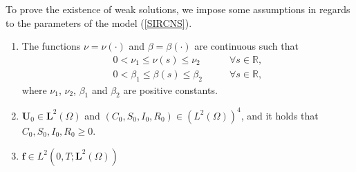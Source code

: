 \documentclass[10pt,number,preprint,times]{elsarticle}
\numberwithin{equation}{section} %
\begin{document}
To prove the existence of weak solutions, we impose some assumptions in regards to the parameters of the model (\ref{SIRCNS}).
\begin{enumerate}
			\item[\textbf{(A1).}] The functions  $\nu=\nu(\cdot)$ and $\beta=\beta(\cdot)$ are continuous such that
			\begin{eqnarray}
				0<\nu_{1} \leq \nu(s) \leq \nu_{2} \qquad & \forall s\in \mathbb{R},\label{cond-mu}\\	
				0<\beta_{1} \leq \beta(s) \leq \beta_{2} \qquad & \forall s\in \mathbb{R}, \label{cond-beta}
			\end{eqnarray}
			where $\nu_1$, $\nu_2$, $\beta_1$ and  $\beta_2$  are positive constants.
			\item[\textbf{(A2).}]  $ \boldsymbol{U}_{0} \in \mathbf{L}^{2}(\Omega)$ and $ (C_0,S_0,I_0,R_0) \in (L^{2}(\Omega))^4$, and it holds that $C_0,S_0,I_0,R_0\geq0$.
			\item[\textbf{(A3).}] $\boldsymbol{f}\in L^2(0,T;\mathbf{L}^2(\Omega))$
\end{enumerate}
\end{document}
